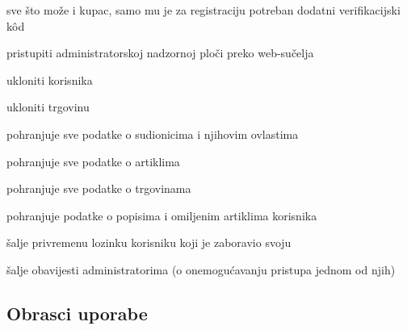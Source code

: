\begin{packed_enum}
\begin{packed_enum}
					\item sve što može i kupac, samo mu je za registraciju potreban dodatni verifikacijski kôd
					\item pristupiti administratorskoj nadzornoj ploči preko web-sučelja
					\item ukloniti korisnika
					\item ukloniti trgovinu
				\end{packed_enum}
			
			
				\item {}
				
				\begin{packed_enum}
					
					\item pohranjuje sve podatke o sudionicima i njihovim ovlastima
					\item pohranjuje sve podatke o artiklima
					\item pohranjuje sve podatke o trgovinama
					
				\end{packed_enum}
				
				\item {}
				
				\begin{packed_enum}
					
					\item pohranjuje podatke o popisima i omiljenim artiklima korisnika
					
				\end{packed_enum}
				
				\item {}
				
				\begin{packed_enum}
					
					\item šalje privremenu lozinku korisniku koji je zaboravio svoju
					\item šalje obavijesti administratorima (o onemogućavanju pristupa jednom od njih)
					
				\end{packed_enum}
			\end{packed_enum}
			
			\eject 
			
			
				
			\subsection{Obrasci uporabe}

